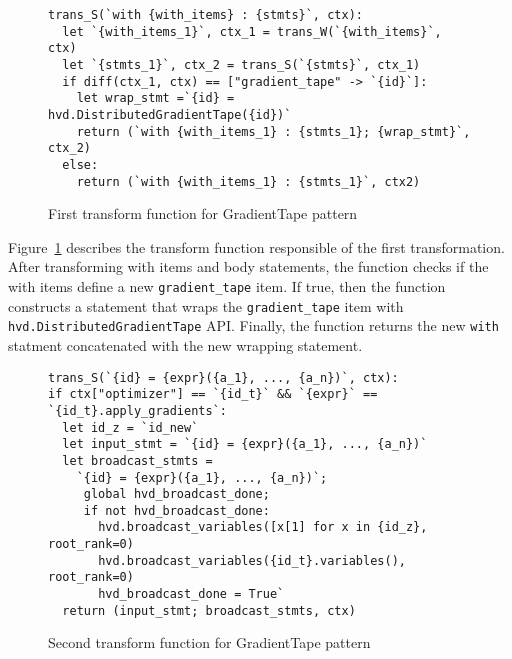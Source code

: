 \begin{figure}[h!]
\begin{lstlisting}[style=mpython]
trans_S(`with {with_items} : {stmts}`, ctx):
  let `{with_items_1}`, ctx_1 = trans_W(`{with_items}`, ctx)
  let `{stmts_1}`, ctx_2 = trans_S(`{stmts}`, ctx_1)
  if diff(ctx_1, ctx) == ["gradient_tape" -> `{id}`]:
    let wrap_stmt =`{id} = hvd.DistributedGradientTape({id})`
    return (`with {with_items_1} : {stmts_1}; {wrap_stmt}`, ctx_2)
  else:
    return (`with {with_items_1} : {stmts_1}`, ctx2)
\end{lstlisting}
\caption{First transform function for GradientTape pattern}
\label{fig:trans:gtapetrans:fn1}
\end{figure}

\begin{inred}
Figure~\ref{fig:trans:gtapetrans:fn1} describes the transform function responsible
of the first transformation.
After transforming with items and body statements,
the function checks if the with items define a new {\tt gradient\_tape} item. 
If true, then the function constructs a statement that wraps the
{\tt gradient\_tape} item with {\tt hvd.DistributedGradientTape} API.
Finally, the function returns the new {\tt with} statment
concatenated with the new wrapping statement.
\end{inred}


\begin{figure}[h!]
\begin{lstlisting}[style=mpython]
trans_S(`{id} = {expr}({a_1}, ..., {a_n})`, ctx):
if ctx["optimizer"] == `{id_t}` && `{expr}` == `{id_t}.apply_gradients`:
  let id_z = `id_new`
  let input_stmt = `{id} = {expr}({a_1}, ..., {a_n})` 
  let broadcast_stmts =
    `{id} = {expr}({a_1}, ..., {a_n})`;
     global hvd_broadcast_done;
     if not hvd_broadcast_done:
       hvd.broadcast_variables([x[1] for x in {id_z}, root_rank=0)
       hvd.broadcast_variables({id_t}.variables(), root_rank=0)
       hvd_broadcast_done = True`
  return (input_stmt; broadcast_stmts, ctx)
\end{lstlisting}
\caption{Second transform function for GradientTape pattern}
\label{fig:trans:gtapetrans:fn2}
\end{figure}

